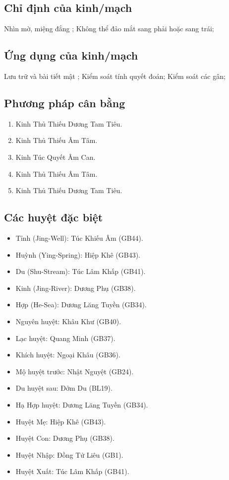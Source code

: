 \documentclass[12pt,a4paper]{article}
\begin{document}
\subsection*{Chỉ định của kinh/mạch}Nhìn mờ, miệng đắng ; Không thể đảo mắt sang phải hoặc sang trái;
\subsection*{Ứng dụng của kinh/mạch}Lưu trữ và bài tiết mật ; Kiểm soát tính quyết đoán; Kiểm soát các gân;
\subsection*{Phương pháp cân bằng}
\begin{enumerate}
\item Kinh Thủ Thiếu Dương Tam Tiêu.
\item Kinh Thủ Thiếu Âm Tâm.
\item Kinh Túc Quyết Âm Can.
\item Kinh Thủ Thiếu Âm Tâm.
\item Kinh Thủ Thiếu Dương Tam Tiêu.
\end{enumerate}
\subsection*{Các huyệt đặc biệt}
\begin{itemize}
\item Tỉnh (Jing-Well): Túc Khiếu Âm (GB44).
\item Huỳnh (Ying-Spring): Hiệp Khê (GB43).
\item Du (Shu-Stream): Túc Lâm Khấp (GB41).
\item Kinh (Jing-River): Dương Phụ (GB38).
\item Hợp (He-Sea): Dương Lăng Tuyền (GB34).
\item Nguyên huyệt: Khâu Khư (GB40).
\item Lạc huyệt: Quang Minh (GB37).
\item Khích huyệt: Ngoại Khâu (GB36).
\item Mộ huyệt trước: Nhật Nguyệt (GB24).
\item Du huyệt sau: Đởm Du (BL19).
\item Hạ Hợp huyệt: Dương Lăng Tuyền (GB34).
\item Huyệt Mẹ: Hiệp Khê (GB43).
\item Huyệt Con: Dương Phụ (GB38).
\item Huyệt Nhập: Đồng Tử Liêu (GB1).
\item Huyệt Xuất: Túc Lâm Khấp (GB41).
\end{itemize}
\end{document}
